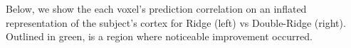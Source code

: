 \documentclass{article}
\begin{document}
    Below, we show the each voxel's prediction correlation on an inflated
representation of the subject's cortex for Ridge (left) vs Double-Ridge
(right). Outlined in green, is a region where noticeable improvement
occurred.


    \begin{center}
    \end{center}
    { \hspace*{\fill} \\}


    
    
    
    
\end{document}
